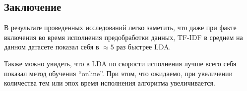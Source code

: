 \subsection*{Заключение}

В результате проведенных исследований легко заметить, что даже при факте включения во время исполнения предобработки данных, TF-IDF в среднем на данном датасете показал себя в $\approx 5$ раз быстрее LDA.

Также можно увидеть, что в LDA по скорости исполнения лучше всего себя показал метод обучения ``online''. При этом, что ожидаемо, при увеличении количества тем или эпох время исполнения алгоритма увеличивается.